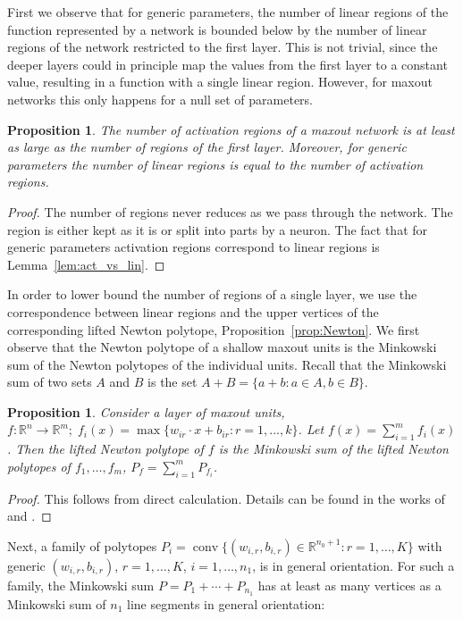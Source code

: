 \documentclass{article}
\newtheorem{proposition}[theorem]{Proposition}
\theoremstyle{definition}
\newcommand{\nin}{n_0}
\begin{document}
\theoremlowerbound*

First we observe that for generic parameters, the number of linear regions of the function represented by a network is bounded below by the number of linear regions of the network restricted to the first layer.
This is not trivial, since the deeper layers could in principle map the values from the first layer to a constant value, resulting in a function with a single linear region. However, for maxout networks this only happens for a null set of parameters.  
\begin{proposition}
\label{prop:deep_bound}
The number of activation regions of a maxout network is at least as large as the number of regions of the first layer. 
Moreover, for generic parameters the number of linear regions is equal to the number of activation regions. 
\end{proposition}

\begin{proof}
The number of regions never reduces as we pass through the network. 
The region is either kept as it is or split into parts by a neuron.
The fact that for generic parameters activation regions correspond to linear regions is Lemma~\ref{lem:act_vs_lin}. 
\end{proof}

In order to lower bound the number of regions of a single layer, we use the correspondence between linear regions and the upper vertices of the corresponding lifted Newton polytope, Proposition~\ref{prop:Newton}.
We first observe that the Newton polytope of a shallow maxout units is the Minkowski sum of the Newton polytopes of the individual units.
Recall that the Minkowski sum of two sets $A$ and $B$ is the set $A+B = \{a+b\colon a\in A, b\in B\}$. 

\begin{proposition}
\label{prop:minkowski-sum}
Consider a layer of maxout units, $f\colon \mathbb{R}^n\to \mathbb{R}^m; \; f_i(x) = \max\{w_{ir}\cdot x + b_{ir}\colon r=1,\ldots, k\}$. Let $f(x) = \sum_{i=1}^m f_i(x)$.
Then the lifted Newton polytope of $f$ is the Minkowski sum of the lifted Newton polytopes of $f_1,\ldots, f_m$, $P_f = \sum_{i=1}^m P_{f_i}$.
\end{proposition} 
\begin{proof}
This follows from direct calculation. 
Details can be found in the works of \cite{zhang2018tropical} and \cite{sharp2021}. 
\end{proof}

Next, a family of polytopes $P_i = \operatorname{conv}\{(w_{i,r},b_{i,r})\in\mathbb{R}^{\nin+1}\colon r=1,\ldots,K\}$ with generic $(w_{i,r},b_{i,r})$, $r=1,\ldots, K$, $i=1,\ldots, n_1$, is in general orientation.
For such a family, the Minkowski sum $P=P_1+\cdots+P_{n_1}$ has at least as many vertices as a Minkowski sum of $n_1$ line segments in general orientation:  
\end{document}
